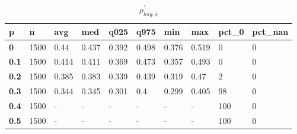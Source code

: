 \begin{table}[h]
 \centering 
\footnotesize
\caption{$\rho_{hsg,s}^\prime $}
\label{tab:alphahsgs}
\begin{tabular}[h]{|l|l|l|l|l|l|l|l|l|l|
    } \hline
\textbf{ p} & \textbf{ n} & \textbf{ avg} & \textbf{ med} & \textbf{ q025} & \textbf{ q975} & \textbf{ min} & \textbf{ max} & \textbf{ pct\_0} & \textbf{ pct\_nan}
    \\ \hline
  \textbf{  0} & 1500 &  0.44 & 0.437 & 0.392 & 0.498 & 0.376 & 0.519 &   0 & 0
    \\ \hline
  \textbf{0.1} & 1500 & 0.414 & 0.411 & 0.369 & 0.473 & 0.357 & 0.493 &   0 & 0
    \\ \hline
  \textbf{0.2} & 1500 & 0.385 & 0.383 & 0.339 & 0.439 & 0.319 &  0.47 &   2 & 0
    \\ \hline
  \textbf{0.3} & 1500 & 0.344 & 0.345 & 0.301 &   0.4 & 0.299 & 0.405 &  98 & 0
    \\ \hline
  \textbf{0.4} & 1500 & - & - & - & - & - & - & 100 & 0
    \\ \hline
  \textbf{0.5} & 1500 & - & - & - & - & - & - & 100 & 0
    \\ \hline
 \end{tabular}
 \end{table}
